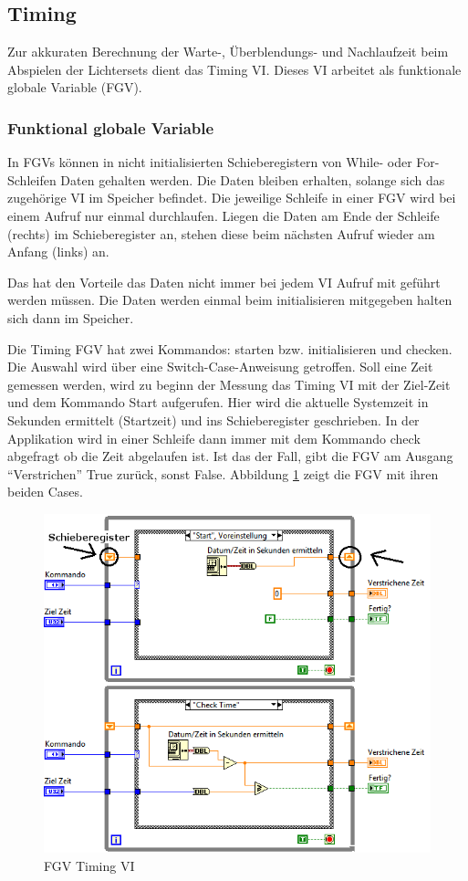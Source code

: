 	
\subsection{Timing}
Zur akkuraten Berechnung der Warte-, Überblendungs- und Nachlaufzeit beim Abspielen der Lichtersets dient das Timing VI. Dieses VI arbeitet als funktionale globale Variable (FGV).

\subsubsection{Funktional globale Variable}
In FGVs können in nicht initialisierten Schieberegistern von While- oder For-Schleifen Daten gehalten werden. 
Die Daten bleiben erhalten, solange sich das zugehörige VI im Speicher befindet. Die jeweilige Schleife in einer FGV wird bei einem Aufruf nur einmal durchlaufen. Liegen die Daten am Ende der Schleife (rechts) im Schieberegister an, stehen diese beim nächsten Aufruf wieder am Anfang (links) an.

Das hat den Vorteile das Daten nicht immer bei jedem VI Aufruf mit geführt werden müssen. Die Daten werden einmal beim initialisieren mitgegeben halten sich dann im Speicher.

Die Timing FGV hat zwei Kommandos: starten bzw. initialisieren und checken. Die Auswahl wird über eine Switch-Case-Anweisung getroffen. Soll eine Zeit gemessen werden, wird zu beginn der Messung das Timing VI mit der Ziel-Zeit und dem Kommando Start aufgerufen. Hier wird die aktuelle Systemzeit in Sekunden ermittelt (Startzeit) und ins Schieberegister geschrieben. In der Applikation wird in einer Schleife dann immer mit dem Kommando check abgefragt ob die Zeit abgelaufen ist. Ist das der Fall, gibt die FGV am Ausgang "`Verstrichen"' True zurück, sonst False. Abbildung \ref{fig:timing} zeigt die FGV mit ihren beiden Cases. 

	\begin{figure}[h!]
	\centering
		\includegraphics[width=\textwidth]{Pics/timing.png}
	\caption{FGV Timing VI}
	\label{fig:timing}
	\end{figure}


